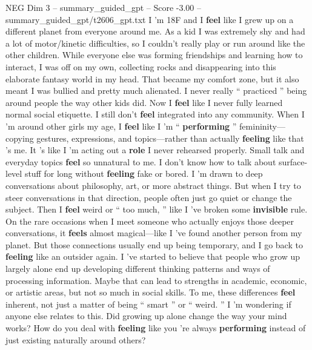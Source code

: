 \begin{textsample}{NEG Dim 3 – summary\_guided\_gpt – Score -3.00 – summary\_guided\_gpt/t2606\_gpt.txt}  \label{ex:f3_neg_025}
I ’m 18F and I \textbf{feel} like I grew up on a different planet from everyone around me.
As a kid I was extremely shy and had a lot of motor/kinetic difficulties, so I couldn't really play or run around like the other children.
While everyone else was forming friendships and learning how to interact, I was off on my own, collecting rocks and disappearing into this elaborate fantasy world in my head.
That became my comfort zone, but it also meant I was bullied and pretty much alienated.
I never really “ practiced ” being around people the way other kids did.
Now I \textbf{feel} like I never fully learned normal social etiquette.
I still don't \textbf{feel} integrated into any community.
When I ’m around other girls my age, I \textbf{feel} like I ’m “ \textbf{performing} ” femininity—copying gestures, expressions, and topics—rather than actually \textbf{feeling} like that ’s me.
It ’s like I ’m acting out a \textbf{role} I never rehearsed properly.
Small talk and everyday topics \textbf{feel} so unnatural to me.
I don't know how to talk about surface-level stuff for long without \textbf{feeling} fake or bored.
I ’m drawn to deep conversations about philosophy, art, or more abstract things.
But when I try to steer conversations in that direction, people often just go quiet or change the subject.
Then I \textbf{feel} weird or “ too much, ” like I ’ve broken some \textbf{invisible} rule.
On the rare occasions when I meet someone who actually enjoys those deeper conversations, it \textbf{feels} almost magical—like I ’ve found another person from my planet.
But those connections usually end up being temporary, and I go back to \textbf{feeling} like an outsider again.
I ’ve started to believe that people who grow up largely alone end up developing different thinking patterns and ways of processing information.
Maybe that can lead to strengths in academic, economic, or artistic areas, but not so much in social skills.
To me, these differences \textbf{feel} inherent, not just a matter of being “ smart ” or “ weird. ” I ’m wondering if anyone else relates to this.
Did growing up alone change the way your mind works?
How do you deal with \textbf{feeling} like you ’re always \textbf{performing} instead of just existing naturally around others?

\end{textsample}
